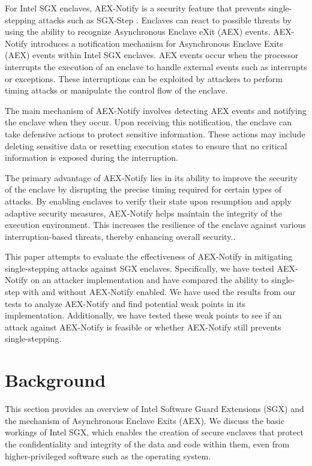 \documentclass{llncs}
\begin{document}
For Intel SGX enclaves, AEX-Notify is a security feature that prevents
single-stepping attacks such as SGX-Step \cite{ConstableBCXXAK23}. Enclaves can
react to possible threats by using the ability to recognize Asynchronous
Enclave eXit (AEX) events. AEX-Notify introduces a notification mechanism for Asynchronous Enclave Exits (AEX) events within Intel SGX enclaves. AEX events occur when the processor interrupts the execution of an enclave to handle external events such as interrupts or exceptions. These interruptions can be exploited by attackers to perform timing attacks or manipulate the control flow of the enclave.

The main mechanism of AEX-Notify involves detecting AEX events and notifying the enclave when they occur. Upon receiving this notification, the enclave can take defensive actions to protect sensitive information. These actions may include deleting sensitive data or resetting execution states to ensure that no critical information is exposed during the interruption.

The primary advantage of AEX-Notify lies in its ability to improve the security of the enclave by disrupting the precise timing required for certain types of attacks. By enabling enclaves to verify their state upon resumption and apply adaptive security measures, AEX-Notify helps maintain the integrity of the execution environment. This increases the resilience of the enclave against various interruption-based threats, thereby enhancing overall security.\cite{ConstableBCXXAK23}.

This paper attempts to evaluate the effectiveness of AEX-Notify in mitigating single-stepping attacks against SGX enclaves.
Specifically, we have tested AEX-Notify on an attacker implementation
and have compared the ability to single-step with and without AEX-Notify enabled.
We have used the results from our tests to analyze AEX-Notify and
find potential weak points in its implementation.
Additionally, we have tested these weak points to see if an attack against AEX-Notify is feasible
or whether AEX-Notify still prevents single-stepping.

\section{Background}

This section provides an overview of Intel Software Guard Extensions (SGX) and the mechanism of Asynchronous Enclave Exits (AEX). We discuss the basic workings of Intel SGX, which enables the creation of secure enclaves that protect the confidentiality and integrity of the data and code within them, even from higher-privileged software such as the operating system.
\end{document}
